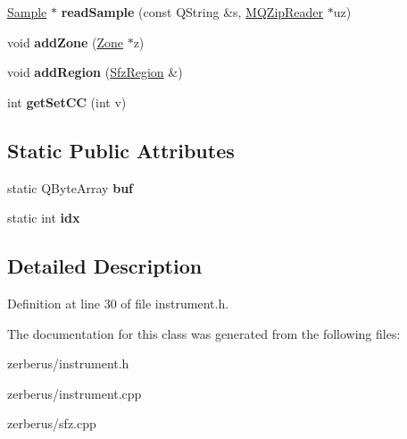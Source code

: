 \begin{DoxyCompactItemize}
\item 
\mbox{\label{class_z_instrument_a7c4775b44c1d9c28e43f2719da2f75e6}} 
\hyperlink{class_sample}{Sample} $\ast$ {\bfseries read\+Sample} (const Q\+String \&s, \hyperlink{class_m_q_zip_reader}{M\+Q\+Zip\+Reader} $\ast$uz)
\item 
\mbox{\label{class_z_instrument_a52d8d71043543260bb39a08dabe6c170}} 
void {\bfseries add\+Zone} (\hyperlink{struct_zone}{Zone} $\ast$z)
\item 
\mbox{\label{class_z_instrument_acf7d6e98f6b414d18493bb51523074a1}} 
void {\bfseries add\+Region} (\hyperlink{struct_sfz_region}{Sfz\+Region} \&)
\item 
\mbox{\label{class_z_instrument_a00e9dd19bd13d4b7a682bfcd025bbc13}} 
int {\bfseries get\+Set\+CC} (int v)
\end{DoxyCompactItemize}
\subsection*{Static Public Attributes}
\begin{DoxyCompactItemize}
\item 
\mbox{\label{class_z_instrument_a333bb2345fe4525e6b6b91db7af0844e}} 
static Q\+Byte\+Array {\bfseries buf}
\item 
\mbox{\label{class_z_instrument_a5ebde6ef526551565b80e1018c0c57ab}} 
static int {\bfseries idx}
\end{DoxyCompactItemize}


\subsection{Detailed Description}


Definition at line 30 of file instrument.\+h.



The documentation for this class was generated from the following files\+:\begin{DoxyCompactItemize}
\item 
zerberus/instrument.\+h\item 
zerberus/instrument.\+cpp\item 
zerberus/sfz.\+cpp\end{DoxyCompactItemize}
